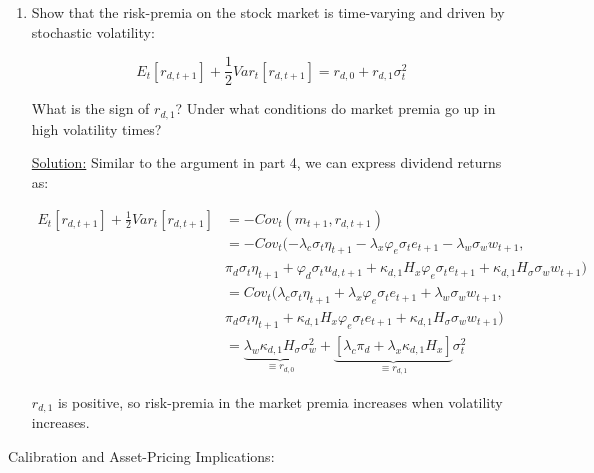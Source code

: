\documentclass{article}
\begin{document}
\begin{enumerate}
\bigskip

\item Show that the risk-premia on the stock market is time-varying and driven by stochastic volatility:

$$
E_t [r_{d,t+1}] + \frac{1}{2} Var_t [r_{d,t+1}] = r_{d,0} + r_{d,1} \sigma_t^2
$$

What is the sign of $r_{d,1}$? Under what conditions do market premia go up in high volatility times?

\bigskip

\underline{Solution:}  Similar to the argument in part 4, we can express dividend returns as:

\begin{align*}
E_t [r_{d,t+1}] + \frac{1}{2} Var_t [r_{d,t+1}] 
&= - Cov_t(m_{t+1}, r_{d,t+1})\\
&= - Cov_t(- \lambda_c \sigma_t \eta_{t+1} - \lambda_x \varphi_e \sigma_t e_{t+1} - \lambda_w \sigma_w w_{t+1}, \\& \pi_d \sigma_t \eta_{t+1} + \varphi_d  \sigma_t u_{d,t+1} + \kappa_{d,1} H_x \varphi_e \sigma_t e_{t+1} + \kappa_{d,1} H_\sigma \sigma_w w_{t+1})\\
&= Cov_t(\lambda_c \sigma_t \eta_{t+1} + \lambda_x \varphi_e \sigma_t e_{t+1} + \lambda_w \sigma_w w_{t+1}, \\& \pi_d \sigma_t \eta_{t+1} + \kappa_{d,1} H_x \varphi_e \sigma_t e_{t+1} + \kappa_{d,1} H_\sigma \sigma_w w_{t+1})\\
&= \underbrace{\lambda_w \kappa_{d,1}H_{\sigma} \sigma_w^2}_{\equiv r_{d,0}} + \underbrace{[\lambda_c \pi_d + \lambda_x \kappa_{d,1} H_x]}_{\equiv r_{d,1}} \sigma_t^2 
\end{align*}

$r_{d,1}$ is positive, so risk-premia in the market premia increases when volatility increases.

\bigskip

\end{enumerate}

\pagebreak

Calibration and Asset-Pricing Implications:
\end{document}
